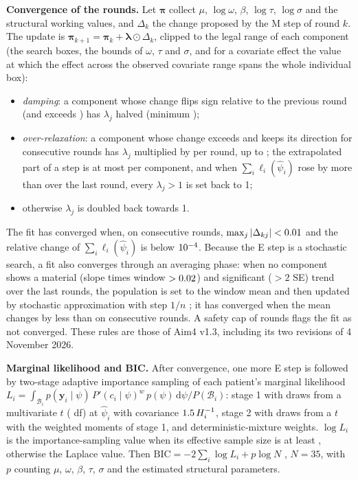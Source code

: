\documentclass[11pt]{article}
\newcommand{\dd}{\mathrm{d}}
\begin{document}
\textbf{Convergence of the rounds.} Let $\boldsymbol\pi$ collect $\mu$, $\log\omega$, $\beta$, $\log\tau$, $\log\sigma$ and the structural working values, and $\Delta_k$ the change proposed by the M step of round $k$. The update is $\boldsymbol\pi_{k+1}=\boldsymbol\pi_k+\boldsymbol\lambda\odot\Delta_k$, clipped to the legal range of each component (the search boxes, the bounds of $\omega$, $\tau$ and $\sigma$, and for a covariate effect the value at which the effect across the observed covariate range spans the whole individual box):
\begin{itemize}
\item \emph{damping}: a component whose change flips sign relative to the previous round (and exceeds \valOutTolPar) has $\lambda_j$ halved (minimum \valOutDampMin);
\item \emph{over-relaxation}: a component whose change exceeds \valOutRelaxMin{} and keeps its direction for \valOutRelaxAfter{} consecutive rounds has $\lambda_j$ multiplied by \valOutRelaxGrow{} per round, up to \valOutLamMax{} \citep{salakhutdinov2003}; the extrapolated part of a step is at most \valOutMaxExtra{} per component, and when $\sum_i\ell_i(\hat\psi_i)$ rose by more than \valOutResetRise{} over the last round, every $\lambda_j>1$ is set back to 1;
\item otherwise $\lambda_j$ is doubled back towards 1.
\end{itemize}
The fit has converged when, on \valOutNok{} consecutive rounds, $\max_j|\Delta_{kj}|<0.01$ and the relative change of $\sum_i\ell_i(\hat\psi_i)$ is below $10^{-4}$. Because the E step is a stochastic search, a fit also converges through an averaging phase: when no component shows a material (slope times window $>0.02$) and significant ($>2$ SE) trend over the last \valOutWindow{} rounds, the population is set to the window mean and then updated by stochastic approximation with step $1/n$ \citep{delyon1999}; it has converged when the mean changes by less than \valOutTolPar{} on \valOutNok{} consecutive rounds. A safety cap of \valOutMax{} rounds flags the fit as not converged. These rules are those of Aim4 v1.3, including its two revisions of 4 November 2026.

\textbf{Marginal likelihood and BIC.} After convergence, one more E step is followed by two-stage adaptive importance sampling of each patient's marginal likelihood $L_i=\int_{\mathcal B_i}p(\mathbf y_i\mid\psi)\,P'(c_i\mid\psi)^w\,p(\psi)\,\dd\psi/P(\mathcal B_i)$: stage 1 with \valIsN{} draws from a multivariate $t$ (\valIsDf{} df) at $\hat\psi_i$ with covariance $1.5\,H_i^{-1}$, stage 2 with \valIsNtwo{} draws from a $t$ with the weighted moments of stage 1, and deterministic-mixture weights. $\log L_i$ is the importance-sampling value when its effective sample size is at least \valIsEss, otherwise the Laplace value. Then $\mathrm{BIC}=-2\sum_i\log L_i+p\log N$ \citep{schwarz1978}, $N=35$, with $p$ counting $\mu$, $\omega$, $\beta$, $\tau$, $\sigma$ and the estimated structural parameters.
\end{document}

